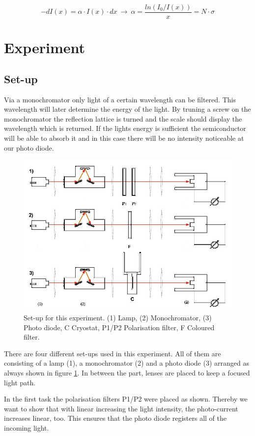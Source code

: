 \documentclass[]{article}
\begin{document}
\begin{equation}
-dI(x) = \alpha \cdot I(x)\cdot dx\ \rightarrow\ \alpha=\frac{ln(I_0 / I(x))}{x} = N\cdot \sigma
\end{equation}


\section{Experiment}
\subsection{Set-up}
Via a monochromator only light of a certain wavelength can be filtered. This wavelength will later determine the energy of the light. By truning a screw on the monochromator the reflection lattice is turned and the scale should display the wavelength which is returned. If the lights energy is sufficient the semiconductor will be able to absorb it and in this case there will be no intensity noticeable at our photo diode. 

\begin{figure}[H]
\centering
\includegraphics[width=.9\textwidth]{Plots/setup.png}
\caption{Set-up for this experiment. (1) Lamp, (2) Monochromator, (3) Photo diode, C Cryostat, P1/P2 Polarisation filter, F Coloured filter. }
\label{fig:setup}
\end{figure}

There are four different set-ups used in this experiment. All of them are consisting of a lamp (1), a monochromator (2) and a photo diode (3) arranged as always shown in figure \ref{fig:setup}. In between the part, lenses are placed to keep a focused light path.

In the first task the polarisation filters P1/P2 were placed as shown. Thereby we want to show that with linear increasing the light intensity, the photo-current increases linear, too. This ensures that the photo diode registers all of the incoming light.
\end{document}
